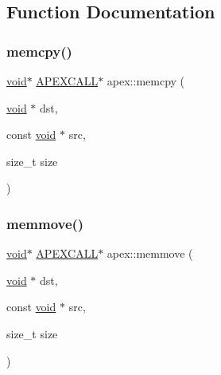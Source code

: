 \subsection{Function Documentation}
\mbox{\label{namespaceapex_a79e1dc7e1396c622877b8fbe32ea80c8}} 
\subsubsection{\texorpdfstring{memcpy()}{memcpy()}}
{\footnotesize\ttfamily \mbox{\hyperlink{glad_8h_a950fc91edb4504f62f1c577bf4727c29}{void}}$\ast$ \mbox{\hyperlink{apex__memmove_8h_a6aba84fc57ecd226cfbf8156697e64a5}{A\+P\+E\+X\+C\+A\+LL}}$\ast$ apex\+::memcpy (\begin{DoxyParamCaption}\item[{\mbox{\hyperlink{glad_8h_a950fc91edb4504f62f1c577bf4727c29}{void}} $\ast$}]{dst,  }\item[{const \mbox{\hyperlink{glad_8h_a950fc91edb4504f62f1c577bf4727c29}{void}} $\ast$}]{src,  }\item[{size\+\_\+t}]{size }\end{DoxyParamCaption})}

\mbox{\label{namespaceapex_a8019d939588203adc6e0c870b9c94bc2}} 
\subsubsection{\texorpdfstring{memmove()}{memmove()}}
{\footnotesize\ttfamily \mbox{\hyperlink{glad_8h_a950fc91edb4504f62f1c577bf4727c29}{void}}$\ast$ \mbox{\hyperlink{apex__memmove_8h_a6aba84fc57ecd226cfbf8156697e64a5}{A\+P\+E\+X\+C\+A\+LL}}$\ast$ apex\+::memmove (\begin{DoxyParamCaption}\item[{\mbox{\hyperlink{glad_8h_a950fc91edb4504f62f1c577bf4727c29}{void}} $\ast$}]{dst,  }\item[{const \mbox{\hyperlink{glad_8h_a950fc91edb4504f62f1c577bf4727c29}{void}} $\ast$}]{src,  }\item[{size\+\_\+t}]{size }\end{DoxyParamCaption})}

\mbox{\label{namespaceapex_a52dc1ca765f4e3d6772f15b4323928b3}} 
